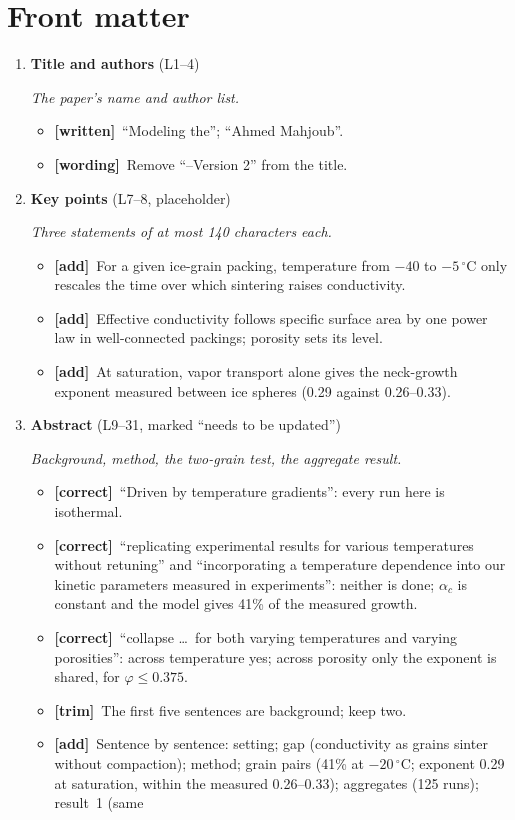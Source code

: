 \documentclass[11pt]{article}
\newcommand{\Have}{\textcolor{have}{\textbf{[written]}}\ }
\newcommand{\Pg}[3]{\item \textbf{#1} {\small(#2)}\par\textit{#3}}
\newcommand{\tC}{\textcolor{miss}{\textbf{[correct]}}\ }
\newcommand{\tG}{\textcolor{stale}{\textbf{[wording]}}\ }
\newcommand{\tT}{\textcolor{cut}{\textbf{[trim]}}\ }
\newcommand{\tA}{\textcolor{have}{\textbf{[add]}}\ }
\begin{document}
\section*{Front matter}
\begin{enumerate}
\Pg{Title and authors}{L1--4}{The paper's name and author list.}
  \begin{itemize}
  \item \Have ``Modeling the''; ``Ahmed Mahjoub''.
  \item \tG Remove ``--Version 2'' from the title.
  \end{itemize}
\Pg{Key points}{L7--8, placeholder}{Three statements of at most 140 characters each.}
  \begin{itemize}
  \item \tA For a given ice-grain packing, temperature from $-40$ to
    $-5\,^{\circ}$C only rescales the time over which sintering raises
    conductivity.
  \item \tA Effective conductivity follows specific surface area by one power
    law in well-connected packings; porosity sets its level.
  \item \tA At saturation, vapor transport alone gives the neck-growth
    exponent measured between ice spheres (0.29 against 0.26--0.33).
  \end{itemize}
\Pg{Abstract}{L9--31, marked ``needs to be updated''}{Background, method, the two-grain test, the aggregate result.}
  \begin{itemize}
  \item \tC ``Driven by temperature gradients'': every run here is
    isothermal.
  \item \tC ``replicating experimental results for various temperatures
    without retuning'' and ``incorporating a temperature dependence into our
    kinetic parameters measured in experiments'': neither is done;
    $\alpha_c$ is constant and the model gives 41\% of the measured growth.
  \item \tC ``collapse \ldots\ for both varying temperatures and varying
    porosities'': across temperature yes; across porosity only the exponent
    is shared, for $\varphi \le 0.375$.
  \item \tT The first five sentences are background; keep two.
  \item \tA Sentence by sentence: setting; gap (conductivity as grains sinter
    without compaction); method; grain pairs (41\% at $-20\,^{\circ}$C;
    exponent 0.29 at saturation, within the measured 0.26--0.33);
    aggregates (125 runs); result~1 (same

\end{itemize}
\end{enumerate}
\end{document}
